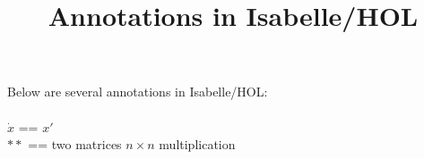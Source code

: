 \documentclass[]{scrartcl}
\title{Annotations in Isabelle/HOL}
\author{}
\begin{document}
\maketitle

\begin{abstract}

\end{abstract}
Below are several annotations in Isabelle/HOL:
\\
\\
$\dot{x}$ == $x'$ \\
$**$ == two matrices $n \times n$ multiplication \\

\end{document}
